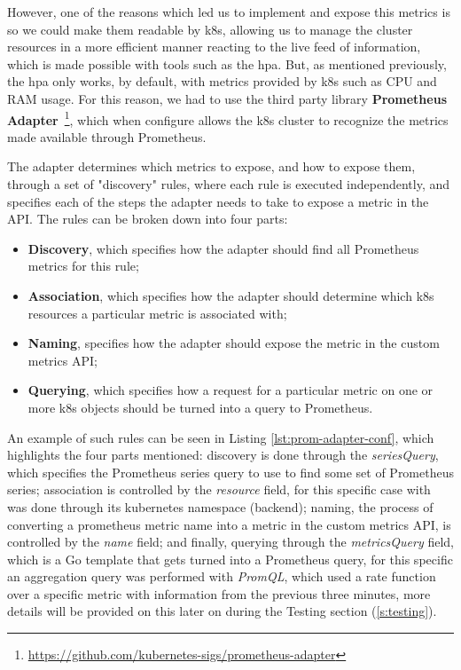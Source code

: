 

However, one of the reasons which led us to implement and expose this metrics is so we could make them readable by \acrshort{k8s}, allowing us to manage the cluster resources in a more efficient manner reacting to the live feed of information, which is made possible with tools such as the \acrshort{hpa}. But, as mentioned previously, the \acrshort{hpa} only works, by default, with metrics provided by \acrshort{k8s} such as CPU and RAM usage. For this reason, we had to use the third party library \textbf{Prometheus Adapter}~\footnote{\url{https://github.com/kubernetes-sigs/prometheus-adapter}}, which when configure allows the \acrshort{k8s} cluster to recognize the metrics made available through Prometheus. 

The adapter determines which metrics to expose, and how to expose them, through a set of "discovery" rules, where each rule is executed independently, and specifies each of the steps the adapter needs to take to expose a metric in the API. The rules can be broken down into four parts:

\begin{itemize}
    \item \textbf{Discovery}, which specifies how the adapter should find all Prometheus metrics for this rule;
    \item \textbf{Association}, which specifies how the adapter should determine which \acrshort{k8s} resources a particular metric is associated with;
    \item \textbf{Naming}, specifies how the adapter should expose the metric in the custom metrics API;
    \item \textbf{Querying}, which specifies how a request for a particular metric on one or more \acrshort{k8s} objects should be turned into a query to Prometheus.
\end{itemize}

An example of such rules can be seen in Listing \ref{lst:prom-adapter-conf}, which highlights the four parts mentioned: discovery is done through the \textit{seriesQuery}, which specifies the Prometheus series query to use to find some set of Prometheus series; association is controlled by the \textit{resource} field, for this specific case with was done through its kubernetes namespace (backend); naming, the process of converting a prometheus metric name into a metric in the custom metrics API, is controlled by the \textit{name} field; and finally, querying through the \textit{metricsQuery} field, which is a Go template that gets turned into a Prometheus query, for this specific an aggregation query was performed with \textit{PromQL}, which used a rate function over a specific metric with information from the previous three minutes, more details will be provided on this later on during the Testing section (\ref{s:testing}).

